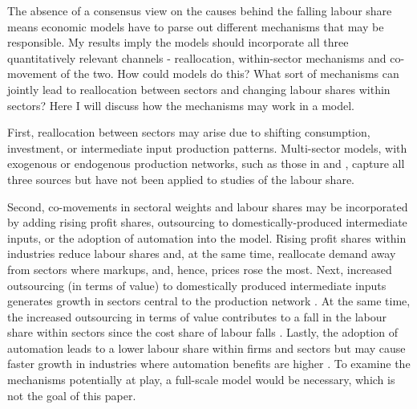 The absence of a consensus view on the causes behind the falling labour share means economic models have to parse out different mechanisms that may be responsible. My results imply the models should incorporate all three quantitatively relevant channels - reallocation, within-sector mechanisms and co-movement of the two. How could models do this? What sort of mechanisms can jointly lead to reallocation between sectors and changing labour shares within sectors? Here I will discuss how the mechanisms may work in a model. 

First, reallocation between sectors may arise due to shifting consumption, investment, or intermediate input production patterns. Multi-sector models, with exogenous or endogenous production networks, such as those in \citet{gagglStructuralChangeProduction2023} and \citet{grassiIOIOSize2017}, capture all three sources but have not been applied to studies of the labour share. 

Second, co-movements in sectoral weights and labour shares may be incorporated by adding rising profit shares, outsourcing to domestically-produced intermediate inputs, or the adoption of automation into the model. Rising profit shares within industries reduce labour shares \citep{autorFallLaborShare2020, barkaiDecliningLaborCapital2020} and, at the same time, reallocate demand away from sectors where markups, and, hence, prices rose the most. Next, increased outsourcing (in terms of value) to domestically produced intermediate inputs generates growth in sectors central to the production network \citep{gagglStructuralChangeProduction2023}. At the same time, the increased outsourcing in terms of value contributes to a fall in the labour share within sectors since the cost share of labour falls \citep{castro-vincenziIntermediateInputPrices2022}. Lastly, the adoption of automation leads to a lower labour share within firms and sectors but may cause faster growth in industries where automation benefits are higher \citep{acemogluAutomationNewTasks2019}. To examine the mechanisms potentially at play, a full-scale model would be necessary, which is not the goal of this paper. 

